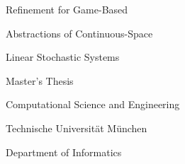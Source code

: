 \startalignment[flushright]
    \dontleavehmode
\stopalignment

\blank[35mm]

{ \CoverTitleFont
    \strut Refinement for Game-Based\blank[4mm]
    \strut Abstractions of Continuous-Space \blank[4mm]
    \strut Linear Stochastic Systems
}

\blank[20mm]

{\SectionFont \Author}

\blank[110mm]

Master's Thesis

Computational Science and Engineering

Technische Universität München

Department of Informatics

